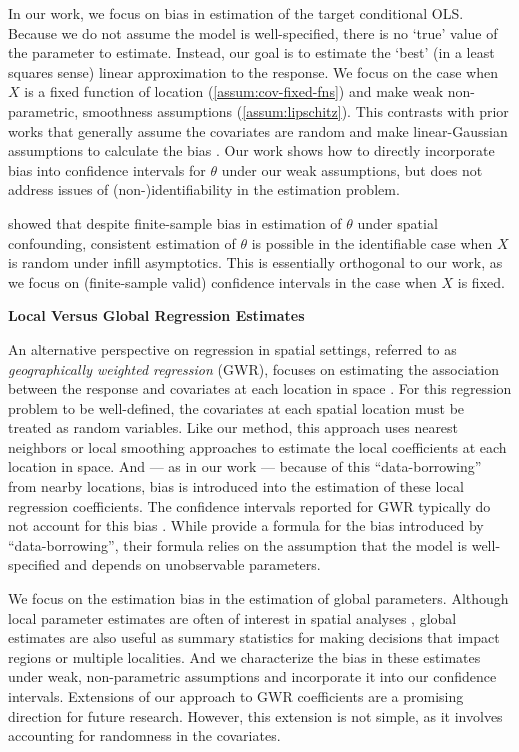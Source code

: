 In our work, we focus on bias in estimation of the target conditional OLS. Because we do not assume the model is well-specified, there is no `true' value of the parameter to estimate. Instead, our goal is to estimate the `best' (in a least squares sense) linear approximation to the response. We focus on the case when $X$ is a fixed function of location (\cref{assum:cov-fixed-fns}) and make weak non-parametric, smoothness assumptions (\cref{assum:lipschitz}). This contrasts with prior works that generally assume the covariates are random
and make linear-Gaussian assumptions to calculate the bias \citep{paciorek_importance_2010,page_estimation_2017}. Our work shows how to directly incorporate bias into confidence intervals for $\theta$ under our weak assumptions, but does not address issues of (non-)identifiability in the estimation problem.

\citet{gilbert_consistency_2024} showed that despite finite-sample bias in estimation of $\theta$ under spatial confounding, consistent estimation of $\theta$ is possible in the identifiable case when $X$ is random under infill asymptotics. This is essentially orthogonal to our work, as we focus on (finite-sample valid) confidence intervals in the case when $X$ is fixed.


\textbf{Local Versus Global Regression Estimates}

An alternative perspective on regression in spatial settings, referred to as \emph{geographically weighted regression} (GWR), focuses on estimating the association between the response and covariates at each location in space \citep{brunsdon1996geographically,fotheringham_geographically_2002}. For this regression problem to be well-defined, the covariates at each spatial location must be treated as random variables. Like our method, this approach uses nearest neighbors or local smoothing approaches to estimate the local coefficients at each location in space. And --- as in our work --- because of this ``data-borrowing'' from nearby locations, bias is introduced into the estimation of these local regression coefficients. The confidence intervals reported for GWR typically do not account for this bias \citep{yu2020measurement}. While \citet{yu2020measurement} provide a formula for the bias introduced by ``data-borrowing'', their formula relies on the assumption that the model is well-specified and depends on unobservable parameters. 

We focus on the estimation bias in the estimation of global parameters. Although local parameter estimates are often of interest in spatial analyses \citep[Chapter 1]{fotheringham_geographically_2002}, global estimates are also useful as summary statistics for making decisions that impact regions or multiple localities. And we characterize the bias in these estimates under weak, non-parametric assumptions and incorporate it into our confidence intervals. Extensions of our approach to GWR coefficients are a promising direction for future research. However, this extension is not simple, as it involves accounting for randomness in the covariates.

